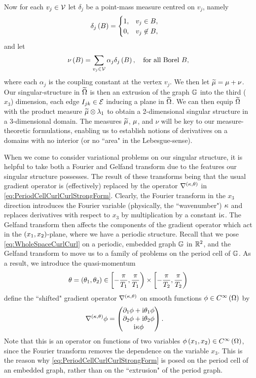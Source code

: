 Now for each $v_j\in\mathcal{V}$ let $\delta_j$ be a point-mass measure centred on $v_j$, namely
\begin{align*}
	\delta_j\left( B \right) &= \begin{cases} 1, & v_j\in B, \\ 0, & v_j\not\in B, \end{cases}
\end{align*}
and let
\begin{align*}
	\nu\left( B \right) = \sum_{v_j\in\mathcal{V}}\alpha_j\delta_j\left( B \right),
	\quad\text{for all Borel } B,
\end{align*}
where each $\alpha_j$ is the coupling constant at the vertex $v_j$.
We then let $\widetilde{\mu} = \mu + \nu$.
Our singular-structure in $\widetilde{\Omega}$ is then an extrusion of the graph $\mathbb{G}$ into the third ($x_3$) dimension, each edge $I_{jk}\in\mathcal{E}$ inducing a plane in $\widetilde{\Omega}$.
We can then equip $\widetilde{\Omega}$ with the product measure $\widetilde{\mu}\otimes\lambda_{1}$ to obtain a 2-dimensional singular structure in a 3-dimensional domain.
The measures $\widetilde{\mu}$, $\mu$, and $\nu$ will be key to our measure-theoretic formulations, enabling us to establish notions of derivatives on a domains with no interior (or no ``area" in the Lebesgue-sense).

When we come to consider variational problems on our singular structure, it is helpful to take both a Fourier and Gelfand transform due to the features our singular structure possesses.
The result of these transforms being that the usual gradient operator is (effectively) replaced by the operator $\nabla^{\left( \kappa, \theta \right)}$ in \eqref{eq:PeriodCellCurlCurlStrongForm}.
Clearly, the Fourier transform in the $x_3$ direction introduces the Fourier variable (physically, the ``wavenumber") $\kappa$ and replaces derivatives with respect to $x_3$ by multiplication by a constant $\mathrm{i}\kappa$.
The Gelfand transform then affects the components of the gradient operator which act in the $\left( x_1,x_2 \right)$-plane, where we have a periodic structure.
Recall that we pose \eqref{eq:WholeSpaceCurlCurl} on a periodic, embedded graph $\mathbb{G}$ in $\mathbb{R}^2$, and the Gelfand transform to move us to a family of problems on the period cell of $\mathbb{G}$.
As a result, we introduce the quasi-momentum
\begin{align*}
	\theta=\left( \theta_1,\theta_2 \right)\in\left[-\frac{\pi}{T_1},\frac{\pi}{T_1}\right)\times\left[-\frac{\pi}{T_2},\frac{\pi}{T_2}\right)
\end{align*}
define the ``shifted" gradient operator $\nabla^{\left( \kappa, \theta \right)}$ on smooth functions $\phi\in C^{\infty}\left( \Omega \right)$ by
\begin{align*}
	\nabla^{\left( \kappa, \theta \right)}\phi &= \begin{pmatrix} \partial_1\phi + \mathrm{i}\theta_1\phi \\ \partial_2\phi + \mathrm{i}\theta_2\phi \\ \mathrm{i}\kappa\phi \end{pmatrix}.
\end{align*}
Note that this is an operator on functions of two variables $\phi\left( x_1,x_2 \right)\in C^{\infty}\left( \Omega \right)$, since the Fourier transform removes the dependence on the variable $x_3$.
This is the reason why \eqref{eq:PeriodCellCurlCurlStrongForm} is posed on the period cell of an embedded graph, rather than on the ``extrusion" of the period graph.


